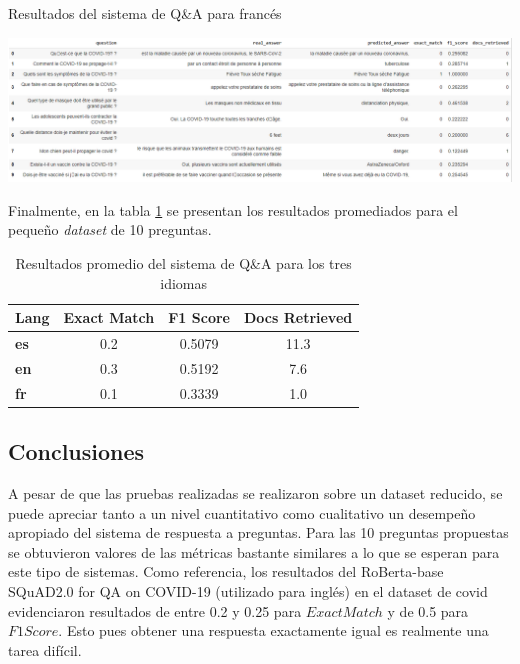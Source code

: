 \begin{table}[H]
    \centering
    \caption{Resultados del sistema de Q\&A para francés}
    \includegraphics[width=\textwidth]{doc_final/images/qa_fr_results.PNG}
    \label{tab:results_fr_qa}
\end{table}

Finalmente, en la tabla \ref{tab:results_qa_summary} se presentan los resultados promediados para el pequeño \textit{dataset} de 10 preguntas.

\begin{table}[H]
\centering
\caption{Resultados promedio del sistema de Q\&A para los tres idiomas}
\begin{tabular}{|l|c|c|c|}
\hline
\multicolumn{1}{|c|}{\textbf{Lang}} & \textbf{Exact Match} & \textbf{F1 Score} & \textbf{Docs Retrieved} \\ \hline
\textbf{es}                         & 0.2                  & 0.5079            & 11.3                    \\ \hline
\textbf{en}                         & 0.3                  & 0.5192            & 7.6                     \\ \hline
\textbf{fr}                         & 0.1                  & 0.3339            & 1.0                     \\ \hline
\end{tabular}
\label{tab:results_qa_summary}
\end{table}

\subsection{Conclusiones}

A pesar de que las pruebas realizadas se realizaron sobre un dataset reducido, se puede apreciar tanto a un nivel cuantitativo como cualitativo un desempeño apropiado del sistema de respuesta a preguntas. Para las 10 preguntas propuestas se obtuvieron valores de las métricas bastante similares a lo que se esperan para este tipo de sistemas. Como referencia, los resultados del RoBerta-base SQuAD2.0 for QA on COVID-19 (utilizado para inglés) en el dataset de covid \cite{moller-etal-2020-covid-qa} evidenciaron resultados de entre 0.2 y 0.25 para $Exact Match$ y de 0.5 para $F1 Score$. Esto pues obtener una respuesta exactamente igual es realmente una tarea difícil. \\

